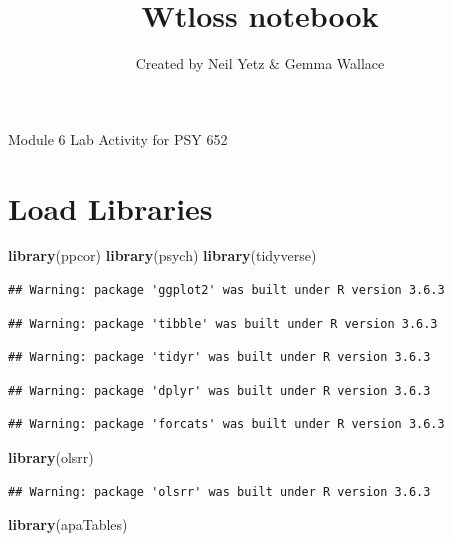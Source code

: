 \documentclass[]{article}
\title{Wtloss notebook}
\subtitle{Created by Neil Yetz \& Gemma Wallace}
\author{}
\date{\vspace{-2.5em}}
\newenvironment{Shaded}{\begin{snugshade}}{\end{snugshade}}
\newcommand{\KeywordTok}[1]{\textcolor[rgb]{0.13,0.29,0.53}{\textbf{#1}}}
\newcommand{\NormalTok}[1]{#1}
\begin{document}
\maketitle

{
\setcounter{tocdepth}{2}
\tableofcontents
}
Module 6 Lab Activity for PSY 652

\section{Load Libraries}\label{load-libraries}

\begin{Shaded}
\begin{Highlighting}[]
\KeywordTok{library}\NormalTok{(ppcor)}
\KeywordTok{library}\NormalTok{(psych)}
\KeywordTok{library}\NormalTok{(tidyverse)}
\end{Highlighting}
\end{Shaded}

\begin{verbatim}
## Warning: package 'ggplot2' was built under R version 3.6.3
\end{verbatim}

\begin{verbatim}
## Warning: package 'tibble' was built under R version 3.6.3
\end{verbatim}

\begin{verbatim}
## Warning: package 'tidyr' was built under R version 3.6.3
\end{verbatim}

\begin{verbatim}
## Warning: package 'dplyr' was built under R version 3.6.3
\end{verbatim}

\begin{verbatim}
## Warning: package 'forcats' was built under R version 3.6.3
\end{verbatim}

\begin{Shaded}
\begin{Highlighting}[]
\KeywordTok{library}\NormalTok{(olsrr)}
\end{Highlighting}
\end{Shaded}

\begin{verbatim}
## Warning: package 'olsrr' was built under R version 3.6.3
\end{verbatim}

\begin{Shaded}
\begin{Highlighting}[]
\KeywordTok{library}\NormalTok{(apaTables)}
\end{Highlighting}
\end{Shaded}
\end{document}
